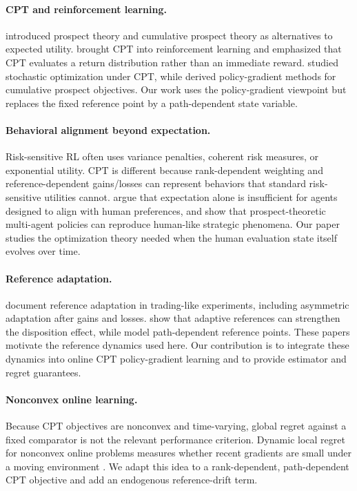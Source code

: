 \documentclass[11pt]{article}
\newcommand{\1}{\mathbf 1}
\newcommand{\CPT}{\ensuremath{\mathrm{CPT}}\xspace}
\begin{document}
\paragraph{CPT and reinforcement learning.}
\citet{kahneman1979prospect,tversky1992advances} introduced prospect theory and cumulative prospect theory as alternatives to expected utility.  \citet{prashanth2016cumulative} brought \CPT into reinforcement learning and emphasized that \CPT evaluates a return distribution rather than an immediate reward.  \citet{jie2018stochastic} studied stochastic optimization under \CPT, while \citet{lepel2024policygradients} derived policy-gradient methods for cumulative prospect objectives.  Our work uses the policy-gradient viewpoint but replaces the fixed reference point by a path-dependent state variable.

\paragraph{Behavioral alignment beyond expectation.}
Risk-sensitive RL often uses variance penalties, coherent risk measures, or exponential utility.  \CPT is different because rank-dependent weighting and reference-dependent gains/losses can represent behaviors that standard risk-sensitive utilities cannot.  \citet{ramasubramanian2021reinforcement} argue that expectation alone is insufficient for agents designed to align with human preferences, and \citet{lalmohammed2025modeling} show that prospect-theoretic multi-agent policies can reproduce human-like strategic phenomena.  Our paper studies the optimization theory needed when the human evaluation state itself evolves over time.

\paragraph{Reference adaptation.}
\citet{arkes2008reference,arkes2010cross} document reference adaptation in trading-like experiments, including asymmetric adaptation after gains and losses.  \citet{he2019realization} show that adaptive references can strengthen the disposition effect, while \citet{qin2022realization} model path-dependent reference points.  These papers motivate the reference dynamics used here.  Our contribution is to integrate these dynamics into online \CPT policy-gradient learning and to provide estimator and regret guarantees.

\paragraph{Nonconvex online learning.}
Because \CPT objectives are nonconvex and time-varying, global regret against a fixed comparator is not the relevant performance criterion.  Dynamic local regret for nonconvex online problems measures whether recent gradients are small under a moving environment \citep{hazan2017efficient,aydore2019dynamic,hallak2021regret}.  We adapt this idea to a rank-dependent, path-dependent \CPT objective and add an endogenous reference-drift term.
\end{document}
